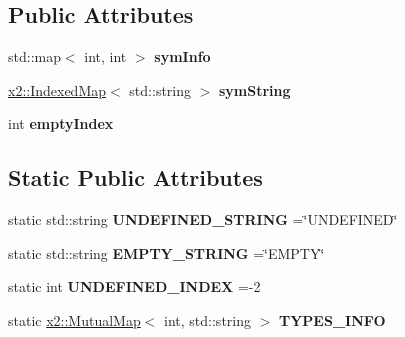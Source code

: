 \subsection*{Public Attributes}
\begin{DoxyCompactItemize}
\item 
\mbox{\label{classx2_1_1_gramma_symbols_a8f772b5a4a70bbb12c36ca21242eb1f3}} 
std\+::map$<$ int, int $>$ {\bfseries sym\+Info}
\item 
\mbox{\label{classx2_1_1_gramma_symbols_a7cbb7fd00c6f5d0425c52fb0a0fc9485}} 
\hyperlink{classx2_1_1_indexed_map}{x2\+::\+Indexed\+Map}$<$ std\+::string $>$ {\bfseries sym\+String}
\item 
\mbox{\label{classx2_1_1_gramma_symbols_a30d8f8988167ae7dcbd2623129db38a3}} 
int {\bfseries empty\+Index}
\end{DoxyCompactItemize}
\subsection*{Static Public Attributes}
\begin{DoxyCompactItemize}
\item 
\mbox{\label{classx2_1_1_gramma_symbols_a4ca98f52f3c65c70b131fc23a71df367}} 
static std\+::string {\bfseries U\+N\+D\+E\+F\+I\+N\+E\+D\+\_\+\+S\+T\+R\+I\+NG} =\char`\"{}U\+N\+D\+E\+F\+I\+N\+ED\char`\"{}
\item 
\mbox{\label{classx2_1_1_gramma_symbols_afd2b07bda6be21be19d11fa785897d41}} 
static std\+::string {\bfseries E\+M\+P\+T\+Y\+\_\+\+S\+T\+R\+I\+NG} =\char`\"{}E\+M\+P\+TY\char`\"{}
\item 
\mbox{\label{classx2_1_1_gramma_symbols_ab8ac76b133ef15a38dad282ca0c41402}} 
static int {\bfseries U\+N\+D\+E\+F\+I\+N\+E\+D\+\_\+\+I\+N\+D\+EX} =-\/2
\item 
\mbox{\label{classx2_1_1_gramma_symbols_a501562880b443f56488fe31ac6a2a941}} 
static \hyperlink{classx2_1_1_mutual_map}{x2\+::\+Mutual\+Map}$<$ int, std\+::string $>$ {\bfseries T\+Y\+P\+E\+S\+\_\+\+I\+N\+FO}
\end{DoxyCompactItemize}


